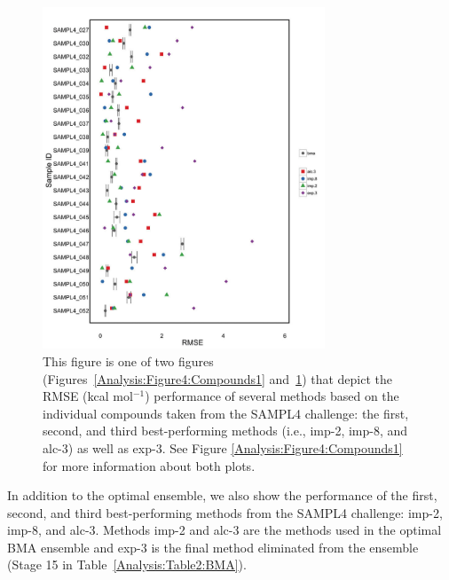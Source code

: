 \documentclass[journal=jpcbfk, manuscript=article]{achemso}
\newcommand{\+}[1]{\ensuremath{\mathbf{#1}}}
\begin{document}
\begin{figure}
	\centering
	\includegraphics[keepaspectratio,width=0.75\textwidth]{Figures/Rev2/error_bar_plot_no_best_split_2}
	\caption{This figure is one of two figures (Figures~\ref{Analysis:Figure4:Compounds1} and~\ref{Analysis:Figure5:Compounds2}) that depict the RMSE (kcal mol$^{-1}$) performance of several methods based on the individual compounds taken from the SAMPL4 challenge: the first, second, and third best-performing methods (i.e., imp-2, imp-8, and alc-3) as well as exp-3.
	See Figure \ref{Analysis:Figure4:Compounds1} for more information about both plots.}
	\label{Analysis:Figure5:Compounds2}
\end{figure}
In addition to the optimal ensemble, we also show the performance of the first, second, and third best-performing methods from the SAMPL4 challenge: imp-2, imp-8, and alc-3.
Methods imp-2 and alc-3 are the methods used in the optimal BMA ensemble and exp-3 is the final method eliminated from the ensemble (Stage 15 in Table~\ref{Analysis:Table2:BMA}). 
\end{document}
